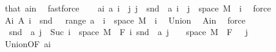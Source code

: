 \begin{isabellebody}
\ that\ a{\isacharunderscore}{\kern0pt}in\ \isamarkupfalse%
\ fastforce\isanewline
\ \ \isamarkupfalse%
\ a{\isacharunderscore}{\kern0pt}i{\isacharcolon}{\kern0pt}\ {\isachardoublequoteopen}a\ i\ {\isacharequal}{\kern0pt}\ {\isacharparenleft}{\kern0pt}{\isasymUnion}j{\isachardot}{\kern0pt}\ {\isacharbraceleft}{\kern0pt}j{\isacharbraceright}{\kern0pt}\ {\isasymtimes}\ {\isacharparenleft}{\kern0pt}snd\ {\isacharbackquote}{\kern0pt}\ {\isacharparenleft}{\kern0pt}a\ i\ {\isasyminter}\ {\isacharparenleft}{\kern0pt}{\isacharbraceleft}{\kern0pt}j{\isacharbraceright}{\kern0pt}\ {\isasymtimes}\ space\ M{\isacharparenright}{\kern0pt}{\isacharparenright}{\kern0pt}{\isacharparenright}{\kern0pt}{\isacharparenright}{\kern0pt}{\isachardoublequoteclose}\ \ i\ \isamarkupfalse%
\ force\isanewline
\ \ \isamarkupfalse%
\ A{\isacharunderscore}{\kern0pt}i{\isacharcolon}{\kern0pt}\ {\isachardoublequoteopen}A\ i\ {\isacharequal}{\kern0pt}\ snd\ {\isacharbackquote}{\kern0pt}\ {\isacharparenleft}{\kern0pt}{\isasymUnion}\ {\isacharparenleft}{\kern0pt}range\ a{\isacharparenright}{\kern0pt}\ {\isasyminter}\ {\isacharparenleft}{\kern0pt}{\isacharbraceleft}{\kern0pt}i{\isacharbraceright}{\kern0pt}\ {\isasymtimes}\ space\ M{\isacharparenright}{\kern0pt}{\isacharparenright}{\kern0pt}{\isachardoublequoteclose}\ \ i\ \isamarkupfalse%
\ Union{\isacharparenleft}{\kern0pt}{}{\isacharparenright}{\kern0pt}\ \isamarkupfalse%
\ A{\isacharunderscore}{\kern0pt}in\ \isamarkupfalse%
\ force\ \isanewline
\ \ \isamarkupfalse%
\ {\isacharasterisk}{\kern0pt}{\isacharcolon}{\kern0pt}\ {\isachardoublequoteopen}snd\ {\isacharbackquote}{\kern0pt}\ {\isacharparenleft}{\kern0pt}a\ j\ {\isasyminter}\ {\isacharparenleft}{\kern0pt}{\isacharbraceleft}{\kern0pt}Suc\ i{\isacharbraceright}{\kern0pt}\ {\isasymtimes}\ space\ M{\isacharparenright}{\kern0pt}{\isacharparenright}{\kern0pt}\ {\isasymin}\ F\ i{\isachardoublequoteclose}\ {\isachardoublequoteopen}snd\ {\isacharbackquote}{\kern0pt}\ {\isacharparenleft}{\kern0pt}a\ j\ {\isasyminter}\ {\isacharparenleft}{\kern0pt}{\isacharbraceleft}{\kern0pt}{}{\isacharbraceright}{\kern0pt}\ {\isasymtimes}\ space\ M{\isacharparenright}{\kern0pt}{\isacharparenright}{\kern0pt}\ {\isasymin}\ F\ {}{\isachardoublequoteclose}\ \ j\ \isamarkupfalse%
\ Union{\isacharparenleft}{\kern0pt}{}{\isacharcomma}{\kern0pt}{}{\isacharparenright}{\kern0pt}{\isacharbrackleft}{\kern0pt}OF\ a{\isacharunderscore}{\kern0pt}i{\isacharbrackright}{\kern0pt}\ \isamarkupfalse%

\end{isabellebody}
